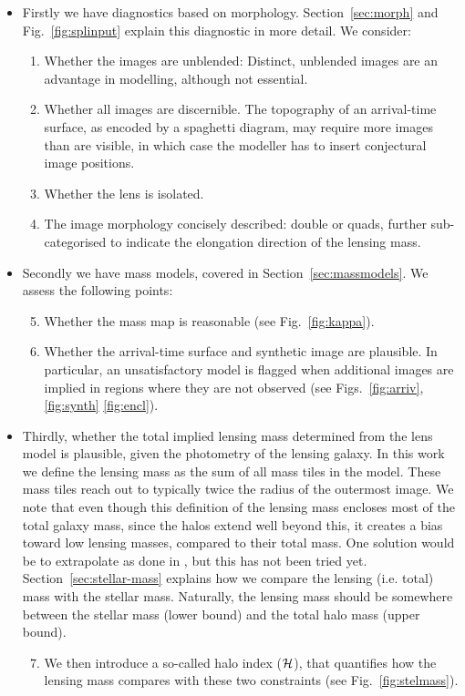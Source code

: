 \begin{itemize}
\item Firstly we have diagnostics based on morphology.
  Section~\ref{sec:morph} and Fig.~\ref{fig:splinput} explain
  this diagnostic in more detail. We consider:
\begin{enumerate}
\item Whether the images are unblended:  Distinct, unblended images are
  an advantage in modelling, although not essential.
\item Whether all images are discernible.  The topography of an
  arrival-time surface, as encoded by a spaghetti diagram, may require
  more images than are visible, in which case the modeller has to
  insert conjectural image positions.
\item Whether the lens is isolated.
\item The image morphology concisely described: double or quads,
  further sub-categorised to indicate the elongation direction of the
  lensing mass.
\end{enumerate}
\item Secondly we have mass models, covered in Section~\ref{sec:massmodels}.
  We assess the following points:
\begin{enumerate}
\setcounter{enumi}{4}
\item Whether the mass map is reasonable (see Fig.~\ref{fig:kappa}).
\item Whether the arrival-time surface and synthetic image are
  plausible. In particular, an unsatisfactory model is flagged when 
  additional images are implied in regions
  where they are not observed (see Figs.~\ref{fig:arriv}, \ref{fig:synth} \ref{fig:encl}).
\end{enumerate}
\item Thirdly, whether the total implied lensing mass determined from
  the lens model is plausible, given the photometry of the lensing
  galaxy.  In this work we define the lensing mass as the sum of all
  mass tiles in the model.  These mass tiles reach out to typically
  twice the radius of the outermost image.
  We note that even though this definition of the lensing mass encloses
  most of the total galaxy mass, since the halos extend well beyond this, it
  creates a bias toward low lensing masses, compared to their total mass.
  One solution would be to extrapolate as done in \citet{2012MNRAS.424..104L},
  but this has not been tried yet.
  Section~\ref{sec:stellar-mass} explains how we compare the lensing
  (i.e. total) mass with the stellar mass. Naturally, the lensing
  mass should be somewhere between the stellar mass (lower bound)
  and the total halo mass (upper bound).
\begin{enumerate}
\setcounter{enumi}{6}
\item We then introduce a so-called halo index ($\mathcal{H}$), that
  quantifies how the lensing mass compares with these two
  constraints (see Fig.~\ref{fig:stelmass}).
\end{enumerate}
\end{itemize}






